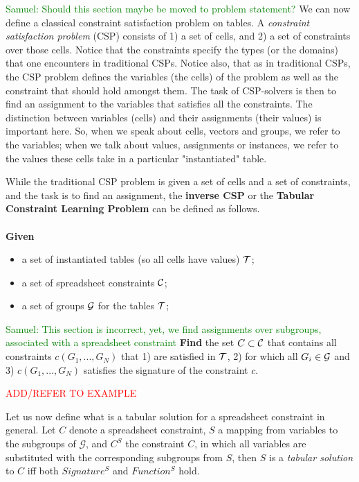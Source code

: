 \documentclass{ecai}
\newcommand{\samuel}[1]{\textcolor{green}{{\sc Samuel:} #1}\xspace}
\newcommand{\CSignature}{Signature\xspace}
\newcommand{\CFunction}{Function\xspace}
\newcommand{\groups}{\ensuremath{\mathcal{G}}\xspace}
\newcommand{\luc}[1]{{\textcolor{red}{#1}}}
\begin{document}
\samuel{Should this section maybe be moved to problem statement?}
We can now define a classical constraint satisfaction problem on tables.
A {\em constraint satisfaction problem} (CSP)  consists of 1) a set of cells, and 2) a set of constraints over those cells.
Notice that the constraints specify the types (or the domains) that one encounters in traditional CSPs.
Notice also, that as in traditional CSPs, the CSP problem defines the variables (the cells) of the problem as well as the constraint that should hold amongst them. The task of CSP-solvers is then to find an assignment to the variables that satisfies all the constraints.
The distinction between variables (cells) and their assignments (their values) is important here.
So, when we speak about cells, vectors and groups, we refer to the variables; when we talk about values, assignments or instances, we refer to the values these cells take in a particular "instantiated" table.

While the traditional CSP problem is given a set of cells and a set of constraints,
and the task is to find an assignment, the {\bf inverse CSP} or the {\bf Tabular Constraint Learning Problem} can be defined as follows.\\
\\
{\bf Given }
\begin{itemize}
\item
a set of instantiated tables (so all cells have values) ${\cal T}$;
\item
a set of spreadsheet constraints ${\cal C}$;
\item
a set of groups ${\cal G}$ for the tables ${\cal T}$;
\end{itemize}
\noindent
\samuel{This section is incorrect, yet, we find assignments over subgroups, associated with a spreadsheet constraint}
{\bf Find}  the set $C\subset {\cal C}$ that contains all constraints $c(G_1, ... , G_N)$ that 1) are satisfied  in ${\cal T}$, 2)
for which
all $G_i \in {\cal G}$ and  3)  $c(G_1, ... , G_N)$ satisfies the signature of the constraint $c$.


\luc{ADD/REFER TO EXAMPLE}

Let us now define what is a tabular solution for a spreadsheet constraint in general. Let $C$ denote a spreadsheet constraint, $S$ a mapping from variables to the subgroups of \groups, and $C^S$ the constraint $C$, in which all variables are substituted with the corresponding subgroups from $S$, then $S$ is a \textit{tabular solution} to $C$ iff both $\CSignature^S$ and $\CFunction^S$ hold.
\end{document}
